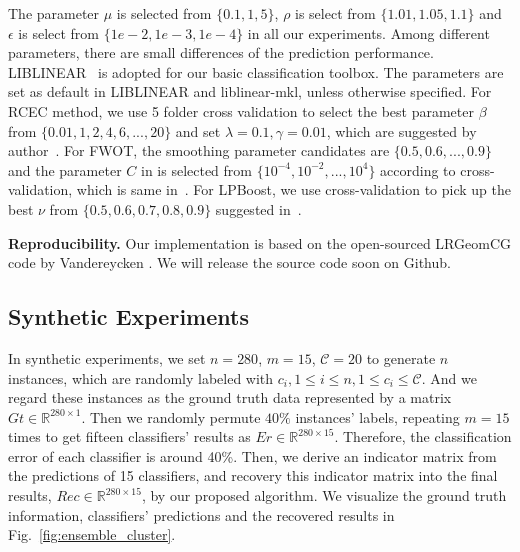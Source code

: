 \documentclass[10pt,twocolumn,letterpaper]{article}
\def\calC{{\mathcal{C}}}
\def\bL{{\bf L}}
\def\dsR{\mathds{R}}
\begin{document}
The parameter $\mu$ is selected from $\{0.1, 1, 5\}$,
$\rho$ is select from $\{1.01, 1.05, 1.1\}$
and $\epsilon$ is select from $\{1e-2, 1e-3, 1e-4\}$ in all our experiments.
Among different parameters, there are small differences of the prediction performance.
LIBLINEAR~\cite{fan2008liblinear} is adopted for our basic classification toolbox.
The parameters are set as default in LIBLINEAR and liblinear-mkl, unless otherwise specified.
For RCEC method, we use 5 folder cross validation to select the best parameter $\beta$ from $\{0.01,1,2,4,6,...,20\}$ and set $\lambda = 0.1, \gamma = 0.01$, which are suggested by author~\cite{yiicdm2012robust}.
For FWOT, the smoothing parameter candidates are $\{0.5, 0.6, ... , 0.9\}$ and the parameter $C$ in is selected from $\{10^{-4},10^{-2},...,10^{4}\}$ according to cross-validation, which is same in~\cite{xuiccv2013feature}.
For LPBoost, we use cross-validation to pick up the best $\nu$ from $\{0.5,0.6,0.7,0.8,0.9\}$ suggested in~\cite{xuiccv2013feature}.

\textbf{Reproducibility.}
Our implementation is based on the open-sourced LRGeomCG code by Vandereycken
\cite{vandereycken2013lowrank}.
We will release the source code soon on Github.

\subsection{Synthetic Experiments}

In synthetic experiments, we set $n = 280$, $m = 15$, $\calC = 20$ to generate $n$ instances, which are randomly labeled with $c_i, 1 \leq i \leq n, 1 \leq c_i \leq \calC$.
And we regard these instances as the ground truth data represented by a matrix $Gt \in \dsR^{280 \times 1}$.
Then we randomly permute $40\%$ instances' labels,
repeating $m = 15$ times to get fifteen classifiers' results as $Er \in \dsR^{280 \times 15}$.
Therefore, the classification error of each classifier is around 40\%.
Then, we derive an indicator matrix from the predictions of 15 classifiers,
and recovery this indicator matrix into the final results, $Rec \in \dsR^{280 \times 15}$, by our proposed algorithm.
We visualize the ground truth information, classifiers' predictions and the recovered results in Fig.~\ref{fig:ensemble_cluster}.
\end{document}
